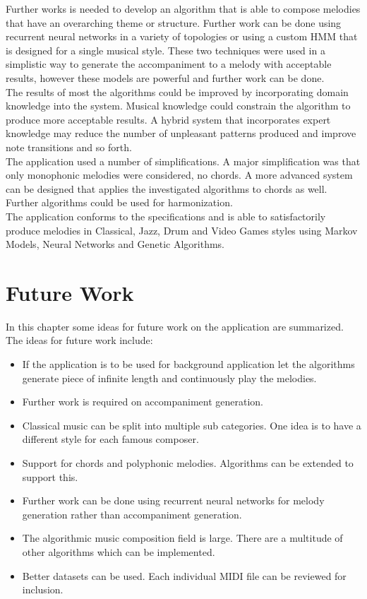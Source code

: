 Further works is needed to develop an algorithm that is able to compose melodies that have an overarching theme or structure.  Further work can be done using recurrent neural networks in a variety of topologies or using a custom \ac{HMM} that is designed for a single musical style. 
These two techniques were used in a simplistic way to generate the accompaniment to a melody with acceptable results, however these models are powerful and further work can be done.
\\

The results of most the algorithms could be improved by incorporating domain knowledge into the system. Musical knowledge could constrain the algorithm to produce more acceptable results. A hybrid system that incorporates expert knowledge may reduce the number of unpleasant patterns produced and improve note transitions and so forth.
\\

The application used a number of simplifications. A major simplification was that only monophonic melodies were considered, no chords. A more advanced system can be designed that applies the investigated algorithms to chords as well. Further algorithms could be used for harmonization.
\\

The application conforms to the specifications and is able to satisfactorily produce melodies in Classical, Jazz, Drum and Video Games styles using Markov Models, Neural Networks and Genetic Algorithms.

\chapter{Future Work}

In this chapter some ideas for future work on the application are summarized.
The ideas for future work include:

\begin{itemize}
\item If the application is to be used for background application let the algorithms generate piece of infinite length and continuously play the melodies.
\item Further work is required on accompaniment generation.
\item Classical music can be split into multiple sub categories. One idea is to have a different style for each famous composer.
\item Support for chords and polyphonic melodies. Algorithms can be extended to support this.
\item Further work can be done using recurrent neural networks for melody generation rather than accompaniment generation.
\item The algorithmic music composition field is large. There are a multitude of other algorithms which can be implemented.
\item Better datasets can be used. Each individual \ac{MIDI} file can be reviewed for inclusion.
\end{itemize}